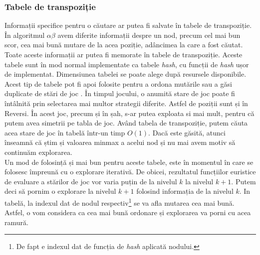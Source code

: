 \documentclass[12pt,twoside,a4paper,fleqn]{book}
\theoremstyle{definition}
\begin{document}
\subsubsection{Tabele de transpoziție}
Informații specifice pentru o căutare ar putea fi salvate în tabele de transpoziție. În algoritmul $\alpha \beta$ avem diferite informații despre un nod, precum cel mai bun scor, cea mai bună mutare de la acea poziție, adâncimea la care a fost căutat. Toate aceste informații ar putea fi memorate în tabele de transpoziție. Aceste tabele sunt în mod normal implementate ca tabele \emph{hash}, cu funcții de \emph{hash} ușor de implementat. Dimensiunea tabelei se poate alege după resursele disponibile. Acest tip de tabele pot fi apoi folosite pentru a ordona mutările sau a găsi duplicate de stări de joc \cite{brokington}. În timpul jocului, o anumită stare de joc poate fi întâlnită prin selectarea mai multor strategii diferite. Astfel de poziții sunt și în Reversi. În acest joc, precum și în șah, s-ar putea exploata si mai mult, pentru că putem avea simetrii pe tabla de joc. Având tabela de transpoziție, putem căuta acea stare de joc în tabelă într-un timp $O(1)$. Dacă este găsită, atunci înseamnă că știm și valoarea minmax a acelui nod și nu mai avem motiv să continuăm explorarea.\\
Un mod de folosință și mai bun pentru aceste tabele, este în momentul în care se folosesc împreună cu o explorare iterativă. De obicei, rezultatul funcțiilor euristice de evaluare a stărilor de joc vor varia puțin de la nivelul $k$ la nivelul $k+1$. Putem deci să pornim o explorare la nivelul $k+1$ folosind informația de la nivelul $k$. In tabelă, la indexul dat de nodul respectiv\footnote{De fapt e indexul dat de funcția de \emph{hash} aplicată nodului.} se va afla mutarea cea mai bună. Astfel, o vom considera ca cea mai bună ordonare și explorarea va porni cu acea ramură.
\end{document}
